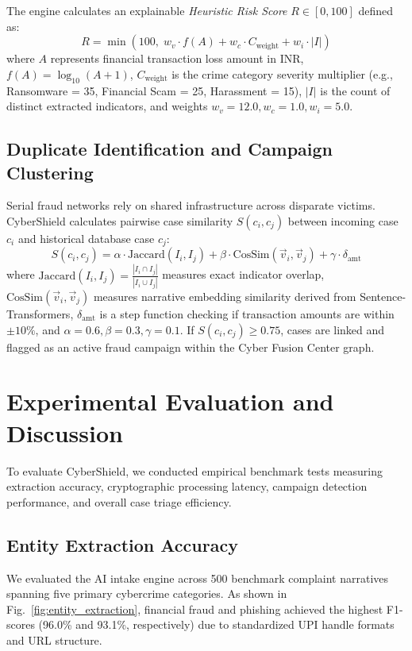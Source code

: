 \documentclass[conference]{IEEEtran}
\begin{document}
The engine calculates an explainable \textit{Heuristic Risk Score} $R \in [0, 100]$ defined as:
\begin{equation}
R = \min\left(100, \; w_v \cdot f(A) + w_c \cdot C_{\text{weight}} + w_i \cdot |I| \right)
\end{equation}
where $A$ represents financial transaction loss amount in INR, $f(A) = \log_{10}(A + 1)$, $C_{\text{weight}}$ is the crime category severity multiplier (e.g., Ransomware = 35, Financial Scam = 25, Harassment = 15), $|I|$ is the count of distinct extracted indicators, and weights $w_v=12.0, w_c=1.0, w_i=5.0$.

\subsection{Duplicate Identification and Campaign Clustering}
Serial fraud networks rely on shared infrastructure across disparate victims. CyberShield calculates pairwise case similarity $S(c_i, c_j)$ between incoming case $c_i$ and historical database case $c_j$:
\begin{equation}
S(c_i, c_j) = \alpha \cdot \text{Jaccard}(I_i, I_j) + \beta \cdot \text{CosSim}(\vec{v}_i, \vec{v}_j) + \gamma \cdot \delta_{\text{amt}}
\end{equation}
where $\text{Jaccard}(I_i, I_j) = \frac{|I_i \cap I_j|}{|I_i \cup I_j|}$ measures exact indicator overlap, $\text{CosSim}(\vec{v}_i, \vec{v}_j)$ measures narrative embedding similarity derived from Sentence-Transformers, $\delta_{\text{amt}}$ is a step function checking if transaction amounts are within $\pm 10\%$, and $\alpha=0.6, \beta=0.3, \gamma=0.1$. If $S(c_i, c_j) \ge 0.75$, cases are linked and flagged as an active fraud campaign within the Cyber Fusion Center graph.

\section{Experimental Evaluation and Discussion}
To evaluate CyberShield, we conducted empirical benchmark tests measuring extraction accuracy, cryptographic processing latency, campaign detection performance, and overall case triage efficiency.

\subsection{Entity Extraction Accuracy}
We evaluated the AI intake engine across 500 benchmark complaint narratives spanning five primary cybercrime categories. As shown in Fig.~\ref{fig:entity_extraction}, financial fraud and phishing achieved the highest F1-scores (96.0\% and 93.1\%, respectively) due to standardized UPI handle formats and URL structure.
\end{document}
